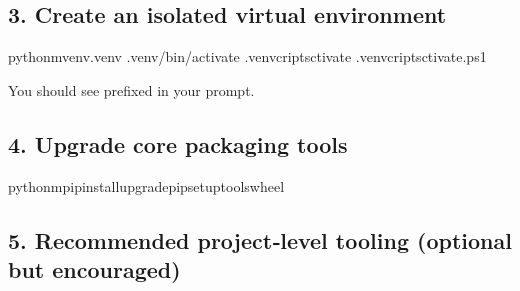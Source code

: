 \documentclass[a4paper,11pt,english]{sphinxmanual}
\begin{document}
\subsection{3. Create an isolated virtual environment}
\label{\detokenize{getting_started/installation:create-an-isolated-virtual-environment}}
\begin{sphinxVerbatim}[commandchars=\\\{\}]
python\PYGZhy{}mvenv.venv
.venv/bin/activate
.venvcriptsctivate
.venvcriptsctivate.ps1
\end{sphinxVerbatim}

\sphinxAtStartPar
You should see  prefixed in your prompt.


\subsection{4. Upgrade core packaging tools}
\label{\detokenize{getting_started/installation:upgrade-core-packaging-tools}}
\begin{sphinxVerbatim}[commandchars=\\\{\}]
python\PYGZhy{}mpipinstall\PYGZhy{}\PYGZhy{}upgradepipsetuptoolswheel
\end{sphinxVerbatim}


\subsection{5. Recommended project‑level tooling (optional but encouraged)}
\label{\detokenize{getting_started/installation:recommended-projectlevel-tooling-optional-but-encouraged}}
\end{document}

